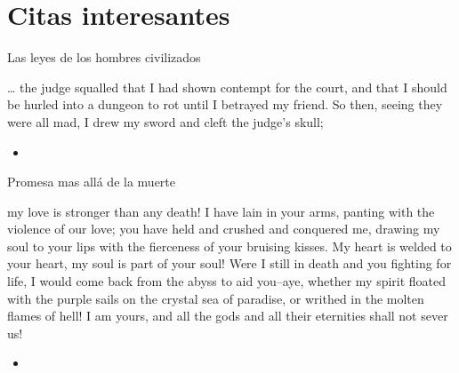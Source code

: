 \section{Citas interesantes}
\note[itemize]{
	\item
}

\begin{frame}{Las leyes de los hombres civilizados}
	\begin{exampleblock}{}
		… the judge squalled that I had shown contempt for the court, and that I should be hurled into a dungeon to rot until I betrayed my friend. So then, seeing they were all mad, I drew my sword and cleft the judge’s skull;
	\end{exampleblock}

	\begin{itemize}
		\item \textit{  }
	\end{itemize}
\end{frame}
\note[itemize]{
	\item
}

\begin{frame}{Promesa mas allá de la muerte}
	\begin{exampleblock}{}
		my love is stronger than any death! I have lain in your arms, panting with the violence of our love; you have held and crushed and conquered me, drawing my soul to your lips with the fierceness of your bruising kisses. My heart is welded to your heart, my soul is part of your soul! Were I still in death and you fighting for life, I would come back from the abyss to aid you–aye, whether my spirit floated with the purple sails on the crystal sea of paradise, or writhed in the molten flames of hell! I am yours, and all the gods and all their eternities shall not sever us!
	\end{exampleblock}

	\begin{itemize}
		\item \textit{  }
	\end{itemize}
\end{frame}
\note[itemize]{
	\item
}

